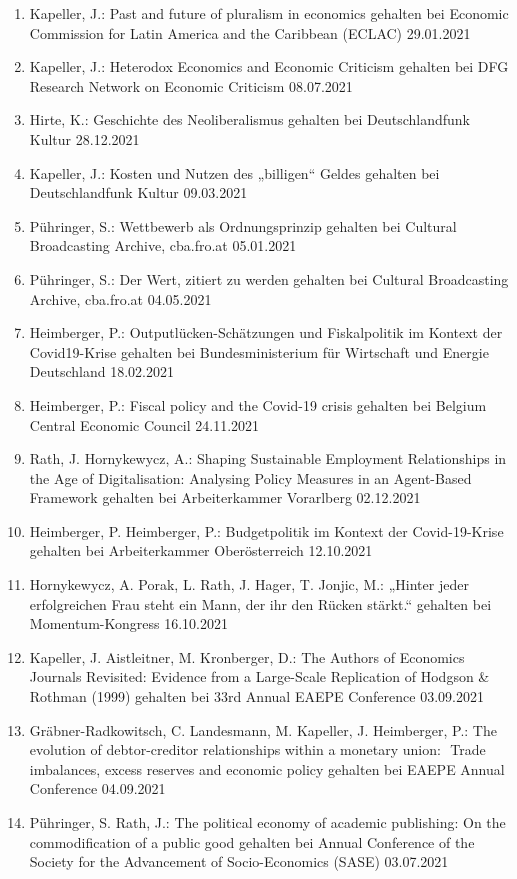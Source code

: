 \begin{enumerate}
	\item Kapeller, J.: Past and future of pluralism in economics gehalten bei Economic Commission for Latin America and the Caribbean (ECLAC) 29.01.2021
	\item Kapeller, J.: Heterodox Economics and Economic Criticism gehalten bei DFG Research Network on Economic Criticism 08.07.2021
	\item Hirte, K.: Geschichte des Neoliberalismus gehalten bei Deutschlandfunk Kultur 28.12.2021
	\item Kapeller, J.: Kosten und Nutzen des „billigen“ Geldes gehalten bei Deutschlandfunk Kultur 09.03.2021
	\item Pühringer, S.: Wettbewerb als Ordnungsprinzip gehalten bei Cultural Broadcasting Archive, cba.fro.at 05.01.2021
	\item Pühringer, S.: Der Wert, zitiert zu werden gehalten bei Cultural Broadcasting Archive, cba.fro.at 04.05.2021
	\item Heimberger, P.: Outputlücken-Schätzungen und Fiskalpolitik im Kontext der Covid19-Krise gehalten bei Bundesministerium für Wirtschaft und Energie Deutschland 18.02.2021
	\item Heimberger, P.: Fiscal policy and the Covid-19 crisis gehalten bei Belgium Central Economic Council 24.11.2021
	\item Rath, J. Hornykewycz, A.: Shaping Sustainable Employment Relationships in the Age of Digitalisation: Analysing Policy Measures in an Agent-Based Framework gehalten bei Arbeiterkammer Vorarlberg 02.12.2021
	\item Heimberger, P. Heimberger, P.: Budgetpolitik im Kontext der Covid-19-Krise gehalten bei Arbeiterkammer Oberösterreich 12.10.2021
	\item Hornykewycz, A. Porak, L. Rath, J.  Hager, T. Jonjic, M.: „Hinter jeder erfolgreichen Frau steht ein Mann, der ihr den Rücken stärkt.“ gehalten bei Momentum-Kongress 16.10.2021
	\item Kapeller, J. Aistleitner, M. Kronberger, D.: The Authors of Economics Journals Revisited: Evidence from a Large-Scale Replication of Hodgson \& Rothman (1999) gehalten bei 33rd Annual EAEPE Conference 03.09.2021
	\item Gräbner-Radkowitsch, C. Landesmann, M. Kapeller, J. Heimberger, P.: The evolution of debtor-creditor relationships within a monetary union:  Trade imbalances, excess reserves and economic policy gehalten bei EAEPE Annual Conference 04.09.2021
	\item Pühringer, S. Rath, J.: The political economy of academic publishing: On the commodification of a public good gehalten bei Annual Conference of the Society for the Advancement of Socio-Economics (SASE) 03.07.2021

\end{enumerate}

